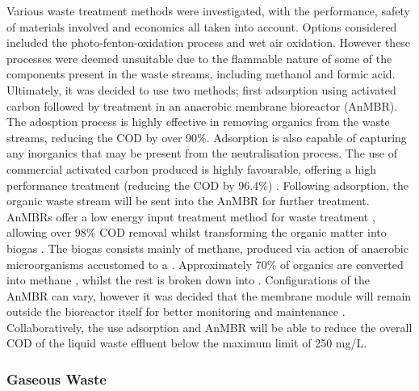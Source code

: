
Various waste treatment methods were investigated, with the performance,  safety of materials involved and economics all taken into account. Options considered included the photo-fenton-oxidation process and wet air oxidation. However these processes were deemed unsuitable due to the flammable nature of some of the components present in the waste streams, including methanol and formic acid. Ultimately, it was decided to use two methods; first adsorption using activated carbon followed by treatment in an anaerobic membrane bioreactor (AnMBR). The adosption process is highly effective in removing organics from the waste streams, reducing the COD by over 90\%. Adsorption is also capable of capturing any inorganics that may be present from the neutralisation process. The use of commercial activated carbon produced is highly favourable,  offering a high performance treatment (reducing the COD by 96.4\%) \cite{aluyor_cod_2008}. Following adsorption, the organic waste stream will be sent into the AnMBR for further treatment. AnMBRs offer a low energy input treatment method for waste treatment \cite{maaz_anaerobic_2019}, allowing over 98\% COD removal whilst transforming the organic matter into biogas \cite{chen_brewery_2016}. The biogas consists mainly of methane, produced via action of anaerobic microorganisms accustomed to a  . Approximately 70\% of organics are converted into methane \cite{ariunbaatar_performance_2021}, whilst the rest is broken down into . Configurations of the AnMBR can vary, however it was decided that the membrane module will remain outside the bioreactor itself for better monitoring and maintenance \cite{maaz_anaerobic_2019}. Collaboratively, the use adsorption and AnMBR will be able to reduce the overall COD of the liquid waste effluent below the maximum limit of 250 mg/L. 

\subsubsection{Gaseous Waste}

